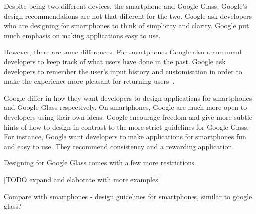 Despite being two different devices, the smartphone and Google Glass, Google's design recommendations are not that different for the two. Google ask developers who are designing for smartphones to think of simplicity and clarity. Google put much emphasis on making applications easy to use.

However, there are some differences. For smartphones Google also recommend developers to keep track of what users have done in the past. Google ask developers to remember the user's input history and customisation in order to make the experience more pleasant for returning users~\cite{androidDesignPrinciples}.

Google differ in how they want developers to design applications for smartphones and Google Glass respectively. On smartphones, Google are much more open to developers using their own ideas. Google encourage freedom and give more subtle hints of how to design in contrast to the more strict guidelines for Google Glass. For instance, Google want developers to make applications for smartphones fun and easy to use. They recommend consistency and a rewarding application.

Designing for Google Glass comes with a few more restrictions. 

[TODO expand and elaborate with more examples]

Compare with smartphones - design guidelines for smartphones, similar to google glass?

